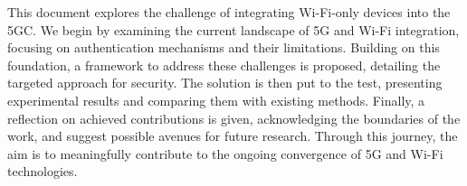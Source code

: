 This document explores the challenge of integrating Wi-Fi-only devices into the \ac{5GC}. We begin by examining the current landscape of \ac{5G} and Wi-Fi integration, focusing on authentication mechanisms and their limitations. Building on this foundation, a framework to address these challenges is proposed, detailing the targeted approach for security. The solution is then put to the test, presenting experimental results and comparing them with existing methods. Finally, a reflection on achieved contributions is given, acknowledging the boundaries of the work, and suggest possible avenues for future research. Through this journey, the aim is to meaningfully contribute to the ongoing convergence of \ac{5G} and Wi-Fi technologies.